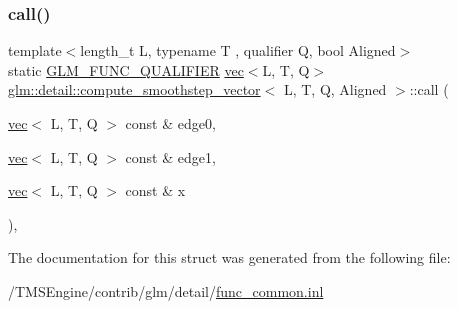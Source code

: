 \subsubsection{\texorpdfstring{call()}{call()}}
{\footnotesize\ttfamily template$<$length\+\_\+t L, typename T , qualifier Q, bool Aligned$>$ \\
static \hyperlink{setup_8hpp_a33fdea6f91c5f834105f7415e2a64407}{G\+L\+M\+\_\+\+F\+U\+N\+C\+\_\+\+Q\+U\+A\+L\+I\+F\+I\+ER} \hyperlink{structglm_1_1vec}{vec}$<$L, T, Q$>$ \hyperlink{structglm_1_1detail_1_1compute__smoothstep__vector}{glm\+::detail\+::compute\+\_\+smoothstep\+\_\+vector}$<$ L, T, Q, Aligned $>$\+::call (\begin{DoxyParamCaption}\item[{\hyperlink{structglm_1_1vec}{vec}$<$ L, T, Q $>$ const \&}]{edge0,  }\item[{\hyperlink{structglm_1_1vec}{vec}$<$ L, T, Q $>$ const \&}]{edge1,  }\item[{\hyperlink{structglm_1_1vec}{vec}$<$ L, T, Q $>$ const \&}]{x }\end{DoxyParamCaption})\hspace{0.3cm}{\ttfamily [inline]}, {\ttfamily [static]}}



The documentation for this struct was generated from the following file\+:\begin{DoxyCompactItemize}
\item 
/\+T\+M\+S\+Engine/contrib/glm/detail/\hyperlink{func__common_8inl}{func\+\_\+common.\+inl}\end{DoxyCompactItemize}
